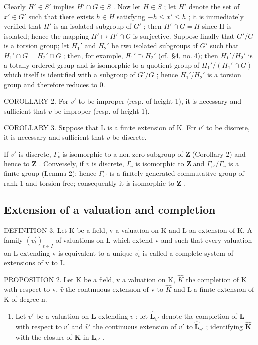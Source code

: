 Clearly \(H' \in S'\) implies \(H' \cap G \in S\) . Now let \(H \in S\) ; let \(H'\) denote the set of \(x' \in G'\) such that there exists \(h \in H\) satisfying \(-h \leqslant x' \leqslant h\) ; it is immediately verified that \(H'\) is an isolated subgroup of \(G'\) ; then \(H' \cap G = H\) since H is isolated; hence the mapping \(H' \mapsto H' \cap G\) is surjective. Suppose finally that \(G'/G\) is a torsion group; let \(H_1'\) and \(H_2'\) be two isolated subgroups of \(G'\) such that \(H_1' \cap G = H_2' \cap G\) ; then, for example, \(H_1' \supset H_2'\) (cf.~§4, no. 4); then \(H_1'/H_2'\) is a totally ordered group and is isomorphic to a quotient group of \(H_1'/(H_1' \cap G)\) which itself is identified with a subgroup of \(G'/G\) ; hence \(H_1'/H_2'\) is a torsion group and therefore reduces to 0.

COROLLARY 2. For \(v'\) to be improper (resp. of height 1), it is necessary and sufficient that \(v\) be improper (resp. of height 1).

COROLLARY 3. Suppose that L is a finite extension of K. For \(v'\) to be discrete, it is necessary and sufficient that \(v\) be discrete.

If \(v'\) is discrete, \(\Gamma_v\) is isomorphic to a non-zero subgroup of \(\mathbf{Z}\) (Corollary 2) and hence to \(\mathbf{Z}\) . Conversely, if \(v\) is discrete, \(\Gamma_v\) is isomorphic to \(\mathbf{Z}\) and \(\Gamma_{v'} / \Gamma_v\) is a finite group (Lemma 2); hence \(\Gamma_{v'}\) is a finitely generated commutative group of rank 1 and torsion-free; consequently it is isomorphic to \(\mathbf{Z}\) .

\subsection{Extension of a valuation and completion}

DEFINITION 3. Let K be a field, v a valuation on K and L an extension of K. A family \((v_{t}^{\prime})_{t\in I}\) of valuations on L which extend v and such that every valuation on L extending v is equivalent to a unique \(v_{t}^{\prime}\) is called a complete system of extensions of v to L.

PROPOSITION 2. Let K be a field, v a valuation on K, \(\hat{K}\) the completion of K with respect to v, \(\hat{v}\) the continuous extension of v to \(\hat{K}\) and L a finite extension of K of degree n.

\begin{enumerate}
\def\labelenumi{(\alph{enumi})}
\tightlist
\item
  Let \(v'\) be a valuation on \(\mathbf{L}\) extending \(v\) ; let \(\hat{\mathbf{L}}_{v'}\) denote the completion of \(\mathbf{L}\) with respect to \(v'\) and \(\hat{v}'\) the continuous extension of \(v'\) to \(\hat{\mathbf{L}}_{v'}\) ; identifying \(\hat{\mathbf{K}}\) with the closure of \(\mathbf{K}\) in \(\hat{\mathbf{L}}_{v'}\) ,
\end{enumerate}

